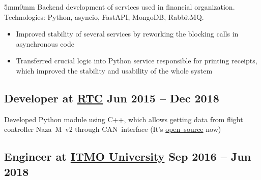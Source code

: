 \documentclass[10pt]{article}
\newcommand{\lmvalue}{5mm}
\newcommand{\rmvalue}{0mm}
\begin{document}
\begin{changemargin}{\lmvalue}{\rmvalue}
	Backend development of services used in financial organization.\\
	Technologies: Python, asyncio, FastAPI, MongoDB, RabbitMQ.\@
	\begin{itemize}
		\item Improved stability of several services by reworking the blocking calls in asynchronous code
		\item Transferred crucial logic into Python service responsible for printing receipts, which improved the stability and usability of the whole system
	\end{itemize}

	\subsection*{Developer at \href{https://er.rtc.ru/en/}{RTC}
		\hfill {\color{gray}Jun 2015 – Dec 2018}}

	Developed Python module using C++, which allows getting data from flight controller Naza~M~v2 through
	CAN~interface (It's \href{https://github.com/viktorvorobev/NazaCanDecoder}{open~source} now)

	\subsection*{Engineer at \href{https://en.itmo.ru/}{ITMO University}
		\hfill {\color{gray}Sep 2016 – Jun 2018}}

\end{changemargin}
\end{document}
